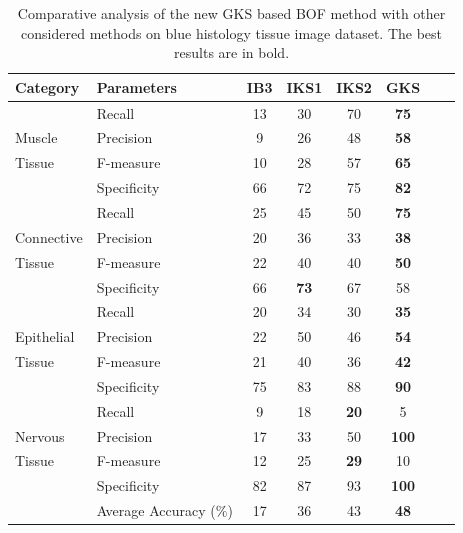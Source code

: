 \begin{table}
\renewcommand{\arraystretch}{1.2}
\centering
\footnotesize
    \caption[Comparative analysis of the new GKS based BOF method with other considered methods on blue histology tissue image dataset in terms of of various performance parameters]{\fontsize{10pt}{12pt}\selectfont Comparative analysis of the new GKS based BOF method with other considered methods on blue histology tissue image dataset. The best results are in bold.}
    \label{ch3:tab:tissue}
    \begin{tabular}{|p{1.5in}|p{1.5in}|c|c|c|c|c|c|}
\hline
\textbf{Category}   &    \textbf{Parameters}    &    \textbf{IB3}    &    \textbf{IKS1}    &    \textbf{IKS2}    &    \textbf{GKS}    \\
\hline
   &    Recall    &    13    &    30    &    70    &\textbf{    75    }\\
Muscle      &    Precision    &    9    &    26    &    48    &\textbf{    58    }\\
  Tissue  &    F-measure    &    10    &    28    &    57    &\textbf{    65    }\\
    &   Specificity &   66  &   72  &   75  & \textbf{    82    }\\
\hline
     &    Recall    &    25    &    45    &    50    &\textbf{    75    }\\
  Connective  &    Precision    &    20    &    36    &    33    &\textbf{    38    }\\
  Tissue  &    F-measure    &    22    &    40    &    40    &\textbf{    50    }\\
    &   Specificity &   66  &   \textbf{73}  &   67  &    58    \\
\hline
     &    Recall    &    20    &    34    &    30    &\textbf{    35    }\\
Epithelial    &    Precision    &    22    &    50    &    46    &\textbf{    54    }\\
  Tissue  &    F-measure    &    21    &    40    &    36    &\textbf{    42    }\\
    &   Specificity &   75  &   83  &   88  &\textbf{    90    }\\ 
\hline
     &    Recall    &    9    &    18    &\textbf{    20    }&    5    \\
Nervous    &    Precision    &    17    &    33    &    50    &\textbf{    100    }\\
 Tissue   &    F-measure    &    12    &    25    &\textbf{    29    }&    10    \\
    &   Specificity &   82  &   87  & 93 & \textbf{100}\\
\hline
& Average Accuracy ($\%$) &  17 & 36 & 43 & \textbf{48}\\
\hline
\end{tabular}
\end{table}
